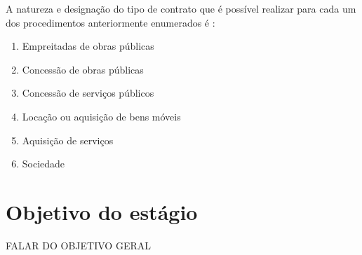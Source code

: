 
A natureza e designação do tipo de contrato que é possível realizar para cada um dos procedimentos anteriormente enumerados é : 

\begin{enumerate}
	\setlength\itemsep{.01cm}
	\item Empreitadas de obras públicas
	\item Concessão de obras públicas
	\item Concessão de serviços públicos
	\item Locação ou aquisição de bens móveis
	\item Aquisição de serviços
	\item Sociedade
\end{enumerate}


\section{Objetivo do estágio}

FALAR DO OBJETIVO GERAL 
\\




